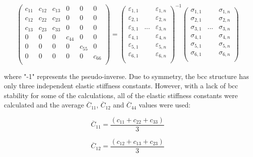 \begin{equation}
\label{eq: hookes}
\begin{pmatrix}
	c_{11} & c_{12} & c_{13} & 0 & 0 & 0\\
	c_{12} & c_{22} & c_{23} & 0 & 0 & 0\\
	c_{13} & c_{23} & c_{33} & 0 & 0 & 0\\
	0 & 0 & 0 & c_{44} & 0 & 0\\
	0 & 0 & 0 & 0 &  c_{55} & 0\\
	0 & 0 & 0 & 0 & 0 & c_{66} \\    		
\end{pmatrix} =
\begin{pmatrix}
	\varepsilon_{1,1} & & \varepsilon_{1,n}\\
	\varepsilon_{2,1} & & \varepsilon_{2,n}\\
	\varepsilon_{3,1} & ... & \varepsilon_{3,n}\\
	\varepsilon_{4,1} & & \varepsilon_{4,n}\\
	\varepsilon_{5,1} & & \varepsilon_{5,n}\\
	\varepsilon_{6,1} & & \varepsilon_{6,n}\\					
\end{pmatrix}^{-1}
\begin{pmatrix}
	\sigma_{1,1} & & \sigma_{1,n}\\
	\sigma_{2,1} & & \sigma_{2,n}\\
	\sigma_{3,1} & ... & \sigma_{3,n}\\
	\sigma_{4,1} & & \sigma_{4,n}\\
	\sigma_{5,1} & & \sigma_{5,n}\\
	\sigma_{6,1} & & \sigma_{6,n}\\					
\end{pmatrix}
\end{equation}

\noindent where "-1" represents the pseudo-inverse. Due to symmetry, the bcc structure has only three independent elastic stiffness constants. However, with a lack of bcc stability for some of the calculations, all of the elastic stiffness constants were calculated and the average $\overline{C}_{11}$, $\overline{C}_{12}$ and $\overline{C}_{44}$ values were used:

\begin{equation}
\label{eq: averagec11}
\overline{C}_{11} = \frac{(c_{11} + c_{22} + c_{33})}{3}
\end{equation}

\begin{equation}
\label{eq: averagec12}
\overline{C}_{12} = \frac{(c_{12} + c_{13} + c_{23})}{3}
\end{equation}

